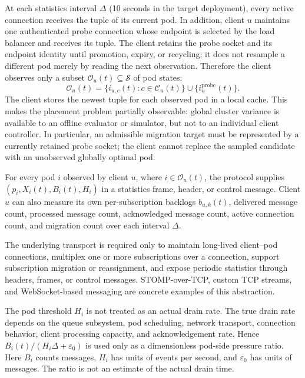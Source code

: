 At each statistics interval $\Delta$ (10 seconds in the target deployment),
every active connection receives the tuple of its current pod. In addition,
client $u$ maintains one authenticated probe connection whose endpoint is
selected by the load balancer and receives its tuple. The client
retains the probe socket and its endpoint identity until promotion, expiry, or
recycling; it does not resample a different pod merely by reading the next
observation. Therefore the client observes only a subset
$\mathcal{O}_u(t)\subseteq\mathcal{S}$ of pod states:
\begin{equation}
	\mathcal{O}_u(t)=
	\{i_{u,c}(t):c\in\mathcal{C}_u(t)\}
	\cup
	\{i^{\mathrm{probe}}_u(t)\}.
\end{equation}
The client stores the newest tuple for each observed pod in a local cache. This
makes the placement problem partially observable: global cluster variance is
available to an offline evaluator or simulator, but not to an individual client
controller. In particular, an admissible migration target must be represented
by a currently retained probe socket; the client cannot replace the sampled
candidate with an unobserved globally optimal pod.

\begin{assumption}
For every pod $i$ observed by client $u$, where $i\in\mathcal{O}_u(t)$, the
protocol supplies $(p_i,X_i(t),B_i(t),H_i)$ in a statistics frame, header, or
control message. Client
$u$ can also measure its own per-subscription backlogs $b_{u,k}(t)$, delivered
message count, processed message count, acknowledged message count, active
connection count, and migration count over each interval $\Delta$.
\end{assumption}

\begin{assumption}
The underlying transport is required only to maintain long-lived client--pod
connections, multiplex one or more subscriptions over a connection, support
subscription migration or reassignment, and expose periodic statistics through
headers, frames, or control messages. STOMP-over-TCP, custom TCP streams, and
WebSocket-based messaging are concrete examples of this abstraction.
\end{assumption}

\begin{remark}
The pod threshold $H_i$ is not treated as an actual drain rate. The true drain
rate depends on the queue subsystem, pod scheduling, network transport,
connection behavior, client processing capacity, and acknowledgement rate.
Hence $B_i(t)/(H_i\Delta+\varepsilon_0)$ is used only as a dimensionless
pod-side pressure ratio. Here $B_i$ counts messages, $H_i$ has units of
events per second, and $\varepsilon_0$ has units of messages. The ratio is
not an estimate of the actual drain time.
\end{remark}

